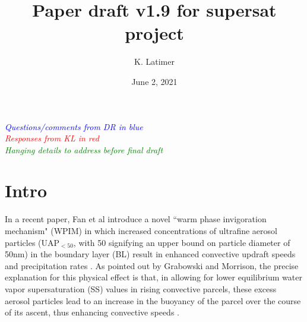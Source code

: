\documentclass{article}
\title{Paper draft v1.9 for supersat project}
\author{K. Latimer}
\date{June 2, 2021}
\newcommand{\drcomm}[1]{\textcolor{blue}{\textit{#1}}}
\newcommand{\klcomm}[1]{\textcolor{red}{\textit{#1}}}
\newcommand{\todo}[1]{\textcolor{green}{\textit{#1}}}
\begin{document}
\maketitle

\noindent\drcomm{Questions/comments from DR in blue} \\
\noindent\klcomm{Responses from KL in red}\\
\noindent\todo{Hanging details to address before final draft}\\

\section{Intro}

In a recent paper, Fan et al introduce a novel ``warm phase invigoration mechanism" (WPIM) in which increased concentrations of ultrafine aerosol particles (UAP$_{<50}$, with 50 signifying an upper bound on particle diameter of 50nm) in the boundary layer (BL) result in enhanced convective updraft speeds and precipitation rates \cite{Fan2018}. As pointed out by Grabowski and Morrison, the precise explanation for this physical effect is that, in allowing for lower equilibrium water vapor supersaturation (SS) values in rising convective parcels, these excess aerosol particles lead to an increase in the buoyancy of the parcel over the course of its ascent, thus enhancing convective speeds \cite{Grabowski2020}.
\end{document}
